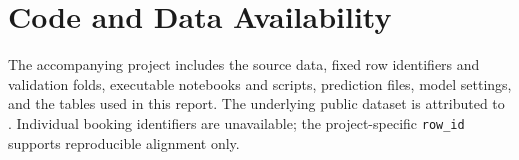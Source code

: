 \documentclass[10pt]{article}
\begin{document}
\printAffiliationsAndNotice{}
\raggedbottom




\section*{Code and Data Availability}
\repositorynotice
The accompanying project includes the source data, fixed row identifiers and validation folds, executable notebooks and scripts, prediction files, model settings, and the tables used in this report. The underlying public dataset is attributed to \citet{antonio2019}. Individual booking identifiers are unavailable; the project-specific \texttt{row\_id} supports reproducible alignment only.
\clearpage


\appendix

\end{document}
